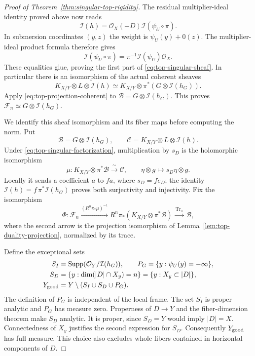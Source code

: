 \documentclass[11pt,reqno]{amsart}
\numberwithin{equation}{section}
\theoremstyle{definition}
\theoremstyle{remark}
\begin{document}
\begin{proof}[Proof of Theorem~\ref{thm:singular-top-rigidity}]
The residual multiplier-ideal identity proved above now reads
\[
 \mathcal I(h)=\mathcal O_X(-D)\mathcal I(\psi_U\circ\pi).
\]
In submersion coordinates $(y,z)$ the weight is $\psi_U(y)+0(z)$.
The multiplier-ideal product formula \cite[Theorem~2.6(i)]{DEL00}
therefore gives
\[
 \mathcal I(\psi_U\circ\pi)
 =\pi^{-1}\mathcal I(\psi_U)\mathcal O_X.
\]
These equalities glue, proving the first part of
\eqref{eq:top-singular-sheaf}. In particular there is an isomorphism
of the actual coherent sheaves
\[
 K_{X/Y}\otimes L\otimes\mathcal I(h)
 \simeq K_{X/Y}\otimes\pi^*(G\otimes\mathcal I(h_G)).
\]
Apply \eqref{eq:top-projection-coherent} to
$\mathcal B=G\otimes\mathcal I(h_G)$. This proves
$\mathcal F_n\simeq G\otimes\mathcal I(h_G)$.

We identify this sheaf isomorphism and its fiber maps before computing
the norm.  Put
\[
 \mathcal B=G\otimes\mathcal I(h_G),\qquad
 \mathcal C=K_{X/Y}\otimes L\otimes\mathcal I(h).
\]
Under \eqref{eq:top-singular-factorization}, multiplication by $s_D$
is the holomorphic isomorphism
\begin{equation}\label{eq:top-sheaf-multiplication}
 \mu:K_{X/Y}\otimes\pi^*\mathcal B\xrightarrow{\ \sim\ }\mathcal C,
 \qquad \eta\otimes g\longmapsto s_D\eta\otimes g.
\end{equation}
Locally it sends a coefficient $a$ to $fa$, where $s_D=f e_D$;
the identity $\mathcal I(h)=f\,\pi^*\mathcal I(h_G)$ proves both
surjectivity and injectivity.  Fix the isomorphism
\[
 \Phi:\mathcal F_n\xrightarrow{(R^n\pi_*\mu)^{-1}}
 R^n\pi_*(K_{X/Y}\otimes\pi^*\mathcal B)
 \xrightarrow{\ \operatorname{Tr}_\pi\ }\mathcal B,
\]
where the second arrow is the projection isomorphism of
Lemma~\ref{lem:top-duality-projection}, normalized by its trace.

Define the exceptional sets
\[
 \begin{aligned}
 S_I&=\operatorname{Supp}(\mathcal O_Y/\mathcal I(h_G)),\qquad
 P_G=\{y:\psi_U(y)=-\infty\},\\
 S_D&=\{y:\dim(|D|\cap X_y)=n\}
      =\{y:X_y\subset |D|\},\\
 Y_{\rm good}&=Y\setminus(S_I\cup S_D\cup P_G).
 \end{aligned}
\]
The definition of $P_G$ is independent of the local frame.
The set $S_I$ is proper analytic and $P_G$ has measure zero.
Properness of $D\to Y$ and the fiber-dimension theorem make $S_D$
analytic.  It is proper, since $S_D=Y$ would imply $|D|=X$.
Connectedness of $X_y$ justifies the second expression for $S_D$.
Consequently $Y_{\rm good}$ has full measure.  This choice also
excludes whole fibers contained in horizontal components of $D$.


\end{proof}
\end{document}
